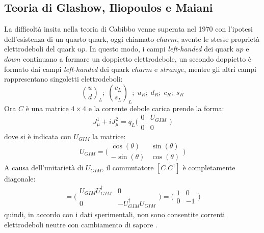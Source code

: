\subsection{Teoria di Glashow, Iliopoulos e Maiani}
\noindent
La difficoltà insita nella teoria di Cabibbo venne superata nel 1970 con l'ipotesi dell'esistenza di un quarto quark, oggi chiamato $charm$,
avente le stesse proprietà elettrodeboli del quark $up$.
In questo modo, i campi \emph{left-handed} dei quark $up$ e $down$ continuano a formare un doppietto elettrodebole, un secondo doppietto è formato
dai campi \emph{left-handed} dei quark $charm$ e $strange$, mentre gli altri campi rappresentano singoletti elettrodeboli:
\begin{equation}
 \binom{u}{d}_L;\;\binom{c_L}{s_L}_L;\;u_R;\;d_R;\;c_R;\;s_R
\end{equation}
Ora $C$ è una matrice $4×4$ e la corrente debole carica prende la forma:
\begin{equation}
 J^1_{\mu} + iJ^2_{\mu} = \bar{q}_L \Bigg(\begin{matrix} 0 & U_{GIM} \\ 0 & 0 \end{matrix}\Bigg)
\end{equation}
dove si è indicata con $U_{GIM}$ la matrice:
\begin{equation}
U_{GIM} = \Bigg(\begin{matrix} \cos(\theta) & \sin(\theta) \\ -\sin(\theta) & \cos(\theta) \end{matrix}\Bigg)
\end{equation}
A causa dell'unitarietà di $U_{GIM}$, il commutatore $[C. C^{\dag}]$ è completamente diagonale:
\begin{equation}
 [C. C^{\dag}] = \Bigg(\begin{matrix} U_{GIM}U_{GIM}^\dag & 0 \\ 0 & -U_{GIM}^\dag U_{GIM} \end{matrix}\Bigg) = \Bigg(\begin{matrix} 1 & 0 \\ 0 & -1 \end{matrix}\Bigg)
\end{equation}
quindi, in accordo con i dati sperimentali, non sono consentite correnti elettrodeboli neutre con cambiamento di sapore \cite{Maiani}.

